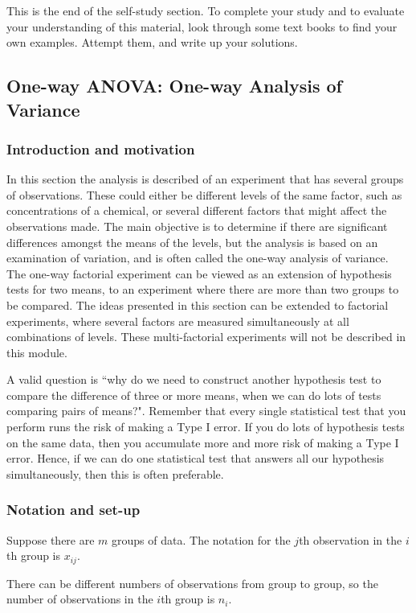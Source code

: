 \documentclass[12pt]{article}
\begin{document}
This is the end of the self-study section. To complete your study and to evaluate your understanding of this material, look through some text books to find your own examples. Attempt them, and write up your solutions.

\newpage

\subsection{One-way ANOVA: One-way Analysis of Variance}
\subsubsection{Introduction and motivation}
In this section the analysis is described of an experiment that has several groups of observations. These could either be different levels of the same factor, such as concentrations of a chemical, or several different factors that might affect the observations made. The main objective is to determine if there are significant differences amongst the means of the levels, but the analysis is based on an examination of variation, and is often called the one-way analysis of variance. The one-way factorial experiment can be viewed as an extension of  hypothesis tests for two means, to an experiment where there are more than two groups to be compared. The ideas presented in this section can be extended to factorial experiments, where several factors are measured simultaneously at all combinations of levels. These multi-factorial experiments will not be described in this module.

A valid question is ``why do we need to construct another hypothesis test to compare the difference of three or more means, when we can do lots of tests comparing pairs of means?". Remember that every single statistical test that you perform runs the risk of making a Type I error. If you do lots of hypothesis tests on the same data, then you accumulate more and more risk of making a Type I error. Hence, if we can do one statistical test that answers all our hypothesis simultaneously, then this is often preferable.

\subsubsection{Notation and set-up}
Suppose there are $m$ groups of data. The notation for the $j$th observation in the $i$th group is $x_{ij}$.

There can be different numbers of observations from group to group, so the number of observations in the $i$th group is $n_i$.
\end{document}
